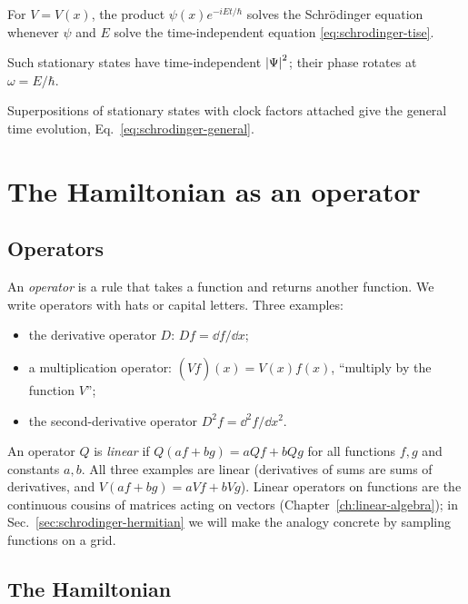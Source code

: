 \begin{keyideas}
\item For $V=V(x)$, the product $\psi(x)e^{-iEt/\hbar}$ solves the Schr\"odinger equation whenever $\psi$ and $E$ solve the time-independent equation \eqref{eq:schrodinger-tise}.
\item Such stationary states have time-independent $\left\lvert \Psi\right\rvert^2$; their phase rotates at $\omega=E/\hbar$.
\item Superpositions of stationary states with clock factors attached give the general time evolution, Eq.~\eqref{eq:schrodinger-general}.
\end{keyideas}

\section{The Hamiltonian as an operator}\label{sec:schrodinger-operators}

\subsection{Operators}

An \emph{operator} is a rule that takes a function and returns another function. We write operators with hats or capital letters. Three examples:
\begin{itemize}
\item the derivative operator $D$: $Df=\dd f/\dd x$;
\item a multiplication operator: $(\hat V f)(x)=V(x)f(x)$, ``multiply by the function $V$'';
\item the second-derivative operator $D^2f=\dd^2 f/\dd x^2$.
\end{itemize}
An operator $Q$ is \emph{linear} if $Q(af+bg)=aQf+bQg$ for all functions $f,g$ and constants $a,b$. All three examples are linear (derivatives of sums are sums of derivatives, and $V(af+bg)=aVf+bVg$). Linear operators on functions are the continuous cousins of matrices acting on vectors (Chapter~\ref{ch:linear-algebra}); in Sec.~\ref{sec:schrodinger-hermitian} we will make the analogy concrete by sampling functions on a grid.

\subsection{The Hamiltonian}

